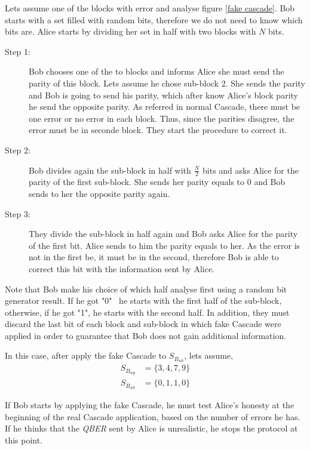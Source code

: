 \begin{enumerate}
\begin{enumerate}
            Lets assume one of the blocks with error and analyse figure \ref{fake cascade}. Bob starts with a set filled with random bits, therefore we do not need to know which bits are. Alice starts by dividing her set in half with two blocks with $N$ bits.

            \begin{description}
              \item [Step 1:] Bob chooses one of the to blocks and informs Alice she must send the parity of this block. Lets assume he chose sub-block 2. She sends the parity and Bob is going to send his parity, which after know Alice's block parity he send the opposite parity. As referred in normal Cascade, there must be one error or no error in each block. Thus, since the parities disagree, the error must be in seconde block. They start the procedure to correct it.
              \item [Step 2:] Bob divides again the sub-block in half with $\frac{N}{2}$ bits and asks Alice for the parity of the first sub-block. She sends her parity equals to 0 and Bob sends to her the opposite parity again.

              \item [Step 3:] They divide the sub-block in half again and Bob asks Alice for the parity of the first bit. Alice sends to him the parity equals to her. As the error is not in the first be, it must be in the second, therefore Bob is able to correct this bit with the information sent by Alice.
            \end{description}

            Note that Bob make his choice of which half analyse first using a random bit generator result. If he got "0" \  he starts with the first half of the sub-block, otherwise, if he got "1", he starts with the second half. In addition, they must discard the last bit of each block and sub-block in which fake Cascade were applied in order to guarantee that Bob does not gain additional information.

            In this case, after apply the fake Cascade to $S_{B_{wb}}$, lets assume,
            \begin{align*}
                S_{B_{wp}} & = \{3,4,7,9 \} \\
                S_{B_{wb}} & = \{0,1,1,0 \}
            \end{align*}


      \end{enumerate}

      If Bob starts by applying the fake Cascade, he must test Alice's honesty at the beginning of the real Cascade application, based on the number of errors he has. If he thinks that the \textit{QBER} sent by Alice is unrealistic, he stops the protocol at this point.



\end{enumerate}
